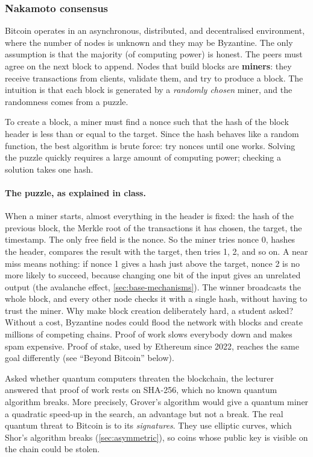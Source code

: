 \subsubsection{Nakamoto consensus}

Bitcoin operates in an asynchronous, distributed, and decentralised environment, where the number of nodes is unknown and they may be Byzantine. The only assumption is that the majority (of computing power) is honest. The peers must agree on the next block to append. Nodes that build blocks are \textbf{miners}: they receive transactions from clients, validate them, and try to produce a block. The intuition is that each block is generated by a \emph{randomly chosen} miner, and the randomness comes from a puzzle.

\begin{definition}
To create a block, a miner must find a nonce such that the hash of the block header is less than or equal to the target. Since the hash behaves like a random function, the best algorithm is brute force: try nonces until one works. Solving the puzzle quickly requires a large amount of computing power; checking a solution takes one hash.
\end{definition}

\paragraph{The puzzle, as explained in class.} When a miner starts, almost everything in the header is fixed: the hash of the previous block, the Merkle root of the transactions it has chosen, the target, the timestamp. The only free field is the nonce. So the miner tries nonce 0, hashes the header, compares the result with the target, then tries 1, 2, and so on. A near miss means nothing: if nonce 1 gives a hash just above the target, nonce 2 is no more likely to succeed, because changing one bit of the input gives an unrelated output (the avalanche effect, \cref{sec:base-mechanisms}). The winner broadcasts the whole block, and every other node checks it with a single hash, without having to trust the miner. Why make block creation deliberately hard, a student asked? Without a cost, Byzantine nodes could flood the network with blocks and create millions of competing chains. Proof of work slows everybody down and makes spam expensive. Proof of stake, used by Ethereum since 2022, reaches the same goal differently (see \enquote{Beyond Bitcoin} below).

\begin{remark}
Asked whether quantum computers threaten the blockchain, the lecturer answered that proof of work rests on SHA-256, which no known quantum algorithm breaks. More precisely, Grover's algorithm would give a quantum miner a quadratic speed-up in the search, an advantage but not a break. The real quantum threat to Bitcoin is to its \emph{signatures}. They use elliptic curves, which Shor's algorithm breaks (\cref{sec:asymmetric}), so coins whose public key is visible on the chain could be stolen.
\end{remark}

